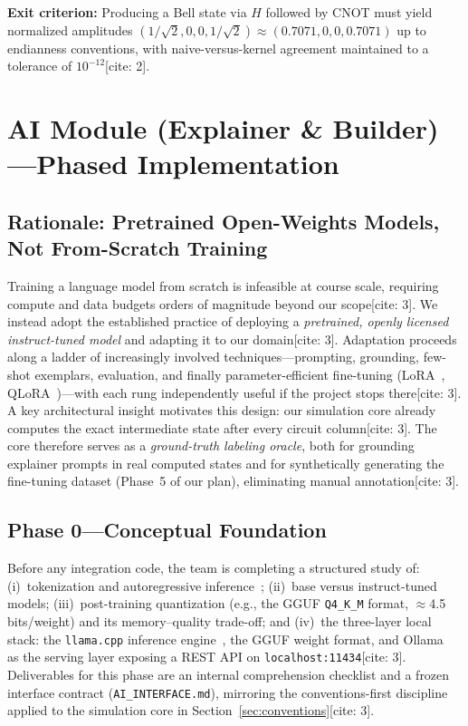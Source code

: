 \documentclass[conference]{IEEEtran}
\begin{document}
\textbf{Exit criterion:} Producing a Bell state via $H$ followed by CNOT must yield normalized amplitudes $(1/\sqrt{2}, 0, 0, 1/\sqrt{2}) \approx (0.7071, 0, 0, 0.7071)$ up to endianness conventions, with naive-versus-kernel agreement maintained to a tolerance of $10^{-12}$[cite: 2].

\section{AI Module (Explainer \& Builder)---Phased Implementation}
\subsection{Rationale: Pretrained Open-Weights Models, Not From-Scratch Training}
Training a language model from scratch is infeasible at course scale, requiring compute and data budgets orders of magnitude beyond our scope[cite: 3]. We instead adopt the established practice of deploying a \emph{pretrained, openly licensed instruct-tuned model} and adapting it to our domain[cite: 3]. Adaptation proceeds along a ladder of increasingly involved techniques---prompting, grounding, few-shot exemplars, evaluation, and finally parameter-efficient fine-tuning (LoRA~\cite{lora}, QLoRA~\cite{qlora})---with each rung independently useful if the project stops there[cite: 3]. A key architectural insight motivates this design: our simulation core already computes the exact intermediate state after every circuit column[cite: 3]. The core therefore serves as a \emph{ground-truth labeling oracle}, both for grounding explainer prompts in real computed states and for synthetically generating the fine-tuning dataset (Phase~5 of our plan), eliminating manual annotation[cite: 3].

\subsection{Phase 0---Conceptual Foundation}
Before any integration code, the team is completing a structured study of: (i)~tokenization and autoregressive inference~\cite{karpathy}; (ii)~base versus instruct-tuned models; (iii)~post-training quantization (e.g., the GGUF \texttt{Q4\_K\_M} format, $\approx$4.5 bits/weight) and its memory--quality trade-off; and (iv)~the three-layer local stack: the \texttt{llama.cpp} inference engine~\cite{llamacpp}, the GGUF weight format, and Ollama~\cite{ollama} as the serving layer exposing a REST API on \texttt{localhost:11434}[cite: 3]. Deliverables for this phase are an internal comprehension checklist and a frozen interface contract (\texttt{AI\_INTERFACE.md}), mirroring the conventions-first discipline applied to the simulation core in Section~\ref{sec:conventions}[cite: 3].
\end{document}
